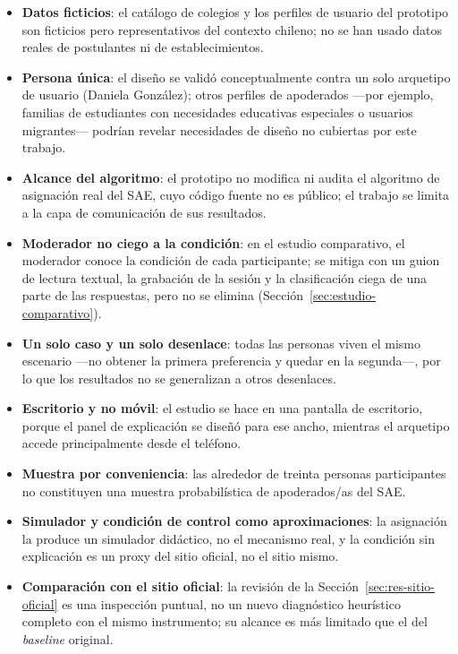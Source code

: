 \begin{itemize}
    \item \textbf{Datos ficticios}: el catálogo de colegios y los perfiles de usuario del prototipo son ficticios pero representativos del contexto chileno; no se han usado datos reales de postulantes ni de establecimientos.
    \item \textbf{Persona única}: el diseño se validó conceptualmente contra un solo arquetipo de usuario (Daniela González); otros perfiles de apoderados —por ejemplo, familias de estudiantes con necesidades educativas especiales o usuarios migrantes— podrían revelar necesidades de diseño no cubiertas por este trabajo.
    \item \textbf{Alcance del algoritmo}: el prototipo no modifica ni audita el algoritmo de asignación real del SAE, cuyo código fuente no es público; el trabajo se limita a la capa de comunicación de sus resultados.
    \item \textbf{Moderador no ciego a la condición}: en el estudio comparativo, el moderador conoce la condición de cada participante; se mitiga con un guion de lectura textual, la grabación de la sesión y la clasificación ciega de una parte de las respuestas, pero no se elimina (Sección~\ref{sec:estudio-comparativo}).
    \item \textbf{Un solo caso y un solo desenlace}: todas las personas viven el mismo escenario ---no obtener la primera preferencia y quedar en la segunda---, por lo que los resultados no se generalizan a otros desenlaces.
    \item \textbf{Escritorio y no móvil}: el estudio se hace en una pantalla de escritorio, porque el panel de explicación se diseñó para ese ancho, mientras el arquetipo accede principalmente desde el teléfono.
    \item \textbf{Muestra por conveniencia}: las alrededor de treinta personas participantes no constituyen una muestra probabilística de apoderados/as del SAE.
    \item \textbf{Simulador y condición de control como aproximaciones}: la asignación la produce un simulador didáctico, no el mecanismo real, y la condición sin explicación es un proxy del sitio oficial, no el sitio mismo.
    \item \textbf{Comparación con el sitio oficial}: la revisión de la Sección~\ref{sec:res-sitio-oficial} es una inspección puntual, no un nuevo diagnóstico heurístico completo con el mismo instrumento; su alcance es más limitado que el del \emph{baseline} original.
\end{itemize}
